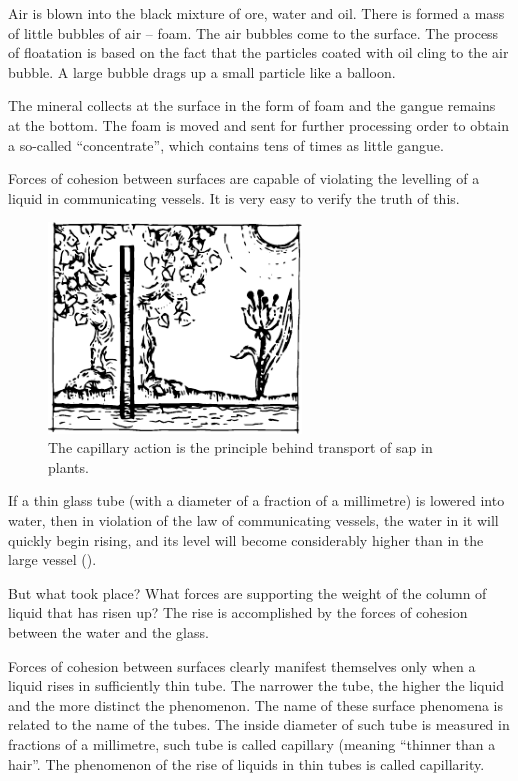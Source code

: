 Air is blown into the black mixture of ore, water and oil. There is formed a mass of little bubbles of air -- foam. The air bubbles come to the surface. The process of floatation is based on the fact that the particles coated with oil cling to the air bubble. A large bubble drags up a small particle like a balloon.

The mineral collects at the surface in the form of foam and the gangue remains at the bottom. The foam is moved and sent for further processing order to obtain a so-called ``concentrate'', which contains tens of times as little gangue.


Forces of cohesion between surfaces are capable of violating the levelling of a liquid in communicating vessels. It is very easy to verify the truth of this.

\begin{figure}[!ht]
\centering
\includegraphics[width=0.6\textwidth]{figures/fig-02-04.pdf}
\caption{The capillary action is the principle behind transport of sap in plants.}
\label{fig-2.4}
\end{figure}

If a thin glass tube (with a diameter of a fraction of a millimetre) is lowered into water, then in violation of the law of communicating vessels, the water in it will quickly begin rising, and its level will become consid­erably higher than in the large vessel ().

But what took place? What forces are supporting the weight of the column of liquid that has risen up? The rise is accomplished by the forces of cohesion between the water and the glass.

Forces of cohesion between surfaces clearly manifest themselves only when a liquid rises in sufficiently thin tube. The narrower the tube, the higher the liquid and the more distinct the phenomenon. The name of these surface phenomena is related to the name of the tubes. The inside diameter of such tube is measured in fractions of a millimetre, such tube is called capillary (meaning ``thinner than a hair''. The phenomenon of the rise of liquids in thin tubes is called capillarity.\label{capillary-force}

